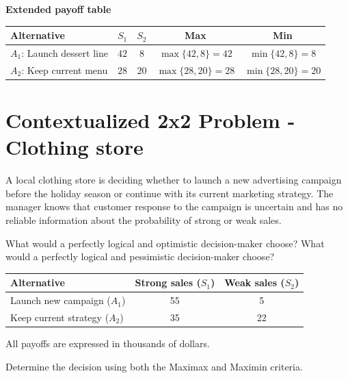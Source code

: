 	\setlength{\columnseprule}{0pt}
	
	\textbf{Extended payoff table}
	
	\begin{center}
		\small
		\renewcommand{\arraystretch}{1.5}
		\setlength{\tabcolsep}{4pt}
		
		\begin{tabular}{lcccc}
			\toprule
			Alternative & $S_1$ & $S_2$ & Max & Min \\
			\midrule
			
			$A_1$: Launch dessert line
			& $42$
			& $8$
			& $\max\{42,8\}=42$
			& $\min\{42,8\}=8$
			\\
			
			$A_2$: Keep current menu
			& $28$
			& $20$
			& $\max\{28,20\}=28$
			& $\min\{28,20\}=20$
			\\
			
			\bottomrule
		\end{tabular}
		\end{center}
	
	\section{Contextualized 2x2 Problem - Clothing store}
	
	A local clothing store is deciding whether to launch a new advertising campaign before the holiday season or continue with its current marketing strategy. The manager knows that customer response to the campaign is uncertain and has no reliable information about the probability of strong or weak sales.
	
	What would a perfectly logical and optimistic decision-maker choose? What would a perfectly logical and pessimistic decision-maker choose?
	
	\begin{center}
		\renewcommand{\arraystretch}{1.3}
		\begin{tabular}{lcc}
			\toprule
			Alternative & Strong sales ($S_1$) & Weak sales ($S_2$) \\
			\midrule
			Launch new campaign ($A_1$) & 55 & 5 \\
			Keep current strategy ($A_2$) & 35 & 22 \\
			\bottomrule
		\end{tabular}
	\end{center}
	
	All payoffs are expressed in thousands of dollars.
	
	Determine the decision using both the Maximax and Maximin criteria.
	

